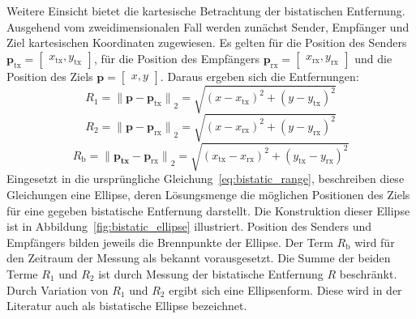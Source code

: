Weitere Einsicht bietet die kartesische Betrachtung der bistatischen Entfernung. Ausgehend vom zweidimensionalen Fall werden zunächst Sender, Empfänger und Ziel kartesischen Koordinaten zugewiesen. Es gelten für die Position des Senders \(\boldsymbol{p}_\text{tx} = \begin{bmatrix} x_\text{tx}, y_\text{tx} \end{bmatrix}\), für die Position des Empfängers \(\boldsymbol{p}_\text{rx} = \begin{bmatrix} x_\text{rx}, y_\text{rx} \end{bmatrix}\) und die Position des Ziels \(\boldsymbol{p} = \begin{bmatrix} x, y \end{bmatrix}\). Daraus ergeben sich die Entfernungen:%
%
\begin{equation}
    R_1 = {\lVert \boldsymbol{p} - \boldsymbol{p}_\text{tx} \rVert}_2 = \sqrt{{(x - x_\text{tx})}^2 + {(y - y_\text{tx})}^2}
\end{equation}
\begin{equation}
    R_2 = {\lVert \boldsymbol{p} - \boldsymbol{p}_\text{rx} \rVert}_2 = \sqrt{{(x - x_\text{rx})}^2 + {(y - y_\text{rx})}^2}
\end{equation}
\begin{equation}
    R_\text{b} = {\lVert \boldsymbol{p_\text{tx}} - \boldsymbol{p}_\text{rx} \rVert}_2 = \sqrt{{(x_\text{tx} - x_\text{rx})}^2 + {(y_\text{tx} - y_\text{rx})}^2}
\end{equation}%
%
Eingesetzt in die ursprüngliche Gleichung~\ref{eq:bistatic_range}, beschreiben diese Gleichungen eine Ellipse, deren Lösungsmenge die möglichen Positionen des Ziels für eine gegeben bistatische Entfernung darstellt. Die Konstruktion dieser Ellipse ist in Abbildung~\ref{fig:bistatic_ellipse} illustriert. Position des Senders und Empfängers bilden jeweils die Brennpunkte der Ellipse. Der Term \(R_\text{b}\) wird für den Zeitraum der Messung als bekannt vorausgesetzt. Die Summe der beiden Terme \(R_1\) und \(R_2\) ist durch Messung der bistatische Entfernung \(R\) beschränkt. Durch Variation von \(R_1\) und \(R_2\) ergibt sich eine Ellipsenform. Diese wird in der Literatur auch als bistatische Ellipse bezeichnet.

